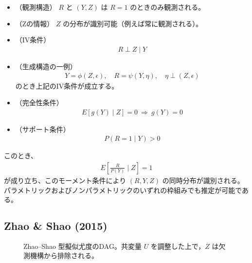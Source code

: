 \documentclass[dvipdfmx,autodetect-engine]{jsarticle}
\newcommand{\1}{\mathbf{1}}
\begin{document}
\begin{itemize}
    \item （観測構造）  
    $R$ と $(Y,Z)$ は $R=1$ のときのみ観測される。

    \item （Zの情報）  
    $Z$ の分布が識別可能（例えば常に観測される）。

    \item （IV条件）
    \begin{align}
    R \perp Z \mid Y
    \end{align}

    \item （生成構造の一例）  
    \begin{align}
    Y = \phi(Z, \epsilon), \quad R = \psi(Y, \eta), \quad \eta \perp (Z, \epsilon)
    \end{align}
    のとき上記のIV条件が成立する。

    \item （完全性条件）
    \begin{align}
    E[g(Y) \mid Z] = 0 \ \Rightarrow\ g(Y) = 0
    \end{align}

    \item （サポート条件）
    \begin{align}
    P(R=1 \mid Y) > 0
    \end{align}
\end{itemize}

このとき、
\begin{align}
E\left[\frac{R}{P(Y)} \mid Z \right] = 1
\end{align}
が成り立ち、このモーメント条件により
$(R,Y,Z)$ の同時分布が識別される。
パラメトリックおよびノンパラメトリックのいずれの枠組みでも推定が可能である。

\subsection{Zhao \& Shao (2015)}

\begin{figure}[tbp]
\centering
{}
\caption{Zhao--Shao 型擬似尤度のDAG。共変量 $U$ を調整した上で，$Z$ は欠測機構から排除される。}
\label{fig:dag-zhao-shao}
\end{figure}
\end{document}
